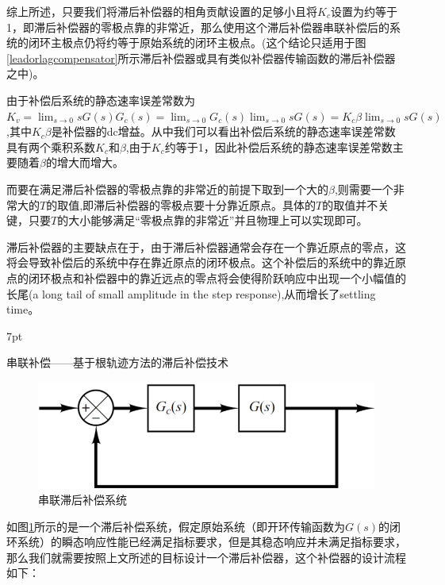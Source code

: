\documentclass{article}
\numberwithin{equation}{section}
\numberwithin{figure}{section}
\newenvironment{formal}{%
\def\FrameCommand{%
\hspace{1pt}%
{\color{DarkBlue}\vrule width 2pt}%
{\color{formalshade}\vrule width 4pt}%
\colorbox{formalshade}%
}%
\MakeFramed{\advance\hsize-\width\FrameRestore}%
\noindent\hspace{-4.55pt}%
\begin{adjustwidth}{}{7pt}%
\vspace{2pt}\vspace{2pt}%
}
{%
\vspace{2pt}\end{adjustwidth}\endMakeFramed%
}
\begin{document}
综上所述，只要我们将滞后补偿器的相角贡献设置的足够小且将$K_c$设置为约等于1，即滞后补偿器的零极点靠的非常近，那么使用这个滞后补偿器串联补偿后的系统的闭环主极点仍将约等于原始系统的闭环主极点。(这个结论只适用于图\ref{leadorlagcompensator}所示滞后补偿器或具有类似补偿器传输函数的滞后补偿器之中)。

由于补偿后系统的静态速率误差常数为$K_v=\lim_{s\rightarrow 0}sG(s)G_c(s)=\lim_{s\rightarrow 0}G_c(s)\lim_{s\rightarrow 0}sG(s)=K_c\beta \lim_{s\rightarrow 0}sG(s)$,其中$K_c\beta$是补偿器的dc增益。从中我们可以看出补偿后系统的静态速率误差常数具有两个乘积系数$K_c$和$\beta$,由于$K_c$约等于1，因此补偿后系统的静态速率误差常数主要随着$\beta$的增大而增大。

而要在满足滞后补偿器的零极点靠的非常近的前提下取到一个大的$\beta$,则需要一个非常大的$T$的取值,即滞后补偿器的零极点要十分靠近原点。具体的$T$的取值并不关键，只要$T$的大小能够满足“零极点靠的非常近”并且物理上可以实现即可。

滞后补偿器的主要缺点在于，由于滞后补偿器通常会存在一个靠近原点的零点，这将会导致补偿后的系统中存在靠近原点的闭环极点。这个补偿后的系统中的靠近原点的闭环极点和补偿器中的靠近远点的零点将会使得阶跃响应中出现一个小幅值的长尾(a long tail of small amplitude in the step response),从而增长了settling time。

\begin{formal}
    串联补偿——基于根轨迹方法的滞后补偿技术
\end{formal}

\begin{figure}
    \centering
    \includegraphics[width=.4\textwidth]{Chapter6/LagCompensationSystem.png} %
    \caption{串联滞后补偿系统} %
    \label{LagCompensationSystem} %
\end{figure}

如图\ref{LagCompensationSystem}所示的是一个滞后补偿系统，假定原始系统（即开环传输函数为$G(s)$的闭环系统）的瞬态响应性能已经满足指标要求，但是其稳态响应并未满足指标要求，那么我们就需要按照上文所述的目标设计一个滞后补偿器，这个补偿器的设计流程如下：
\end{document}
